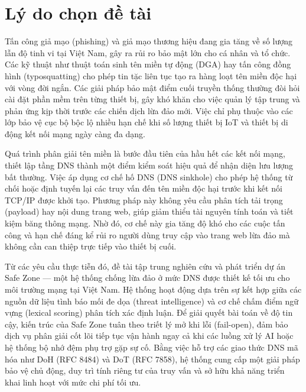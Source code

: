 \section{Lý do chọn đề tài}

Tấn công giả mạo (phishing) và giả mạo thương hiệu đang gia tăng về số lượng lẫn độ tinh vi tại Việt Nam, gây ra rủi ro bảo mật lớn cho cá nhân và tổ chức. Các kỹ thuật như thuật toán sinh tên miền tự động (DGA) hay tấn công đồng hình (typosquatting) cho phép tin tặc liên tục tạo ra hàng loạt tên miền độc hại với vòng đời ngắn. Các giải pháp bảo mật điểm cuối truyền thống thường đòi hỏi cài đặt phần mềm trên từng thiết bị, gây khó khăn cho việc quản lý tập trung và phản ứng kịp thời trước các chiến dịch lừa đảo mới. Việc chỉ phụ thuộc vào các lớp bảo vệ cục bộ bộc lộ nhiều hạn chế khi số lượng thiết bị IoT và thiết bị di động kết nối mạng ngày càng đa dạng.

Quá trình phân giải tên miền là bước đầu tiên của hầu hết các kết nối mạng, thiết lập tầng DNS thành một điểm kiểm soát hiệu quả để nhận diện lưu lượng bất thường. Việc áp dụng cơ chế hố DNS (DNS sinkhole) cho phép hệ thống từ chối hoặc định tuyến lại các truy vấn đến tên miền độc hại trước khi kết nối TCP/IP được khởi tạo. Phương pháp này không yêu cầu phân tích tải trọng (payload) hay nội dung trang web, giúp giảm thiểu tài nguyên tính toán và tiết kiệm băng thông mạng. Nhờ đó, cơ chế này gia tăng độ khó cho các cuộc tấn công và hạn chế đáng kể rủi ro người dùng truy cập vào trang web lừa đảo mà không cần can thiệp trực tiếp vào thiết bị cuối.

Từ các yêu cầu thực tiễn đó, đề tài tập trung nghiên cứu và phát triển dự án Safe Zone --- một hệ thống chống lừa đảo ở mức DNS được thiết kế tối ưu cho môi trường mạng tại Việt Nam. Hệ thống hoạt động dựa trên sự kết hợp giữa các nguồn dữ liệu tình báo mối đe dọa (threat intelligence) và cơ chế chấm điểm ngữ vựng (lexical scoring) phân tích xác định luận. Để giải quyết bài toán về độ tin cậy, kiến trúc của Safe Zone tuân theo triết lý mở khi lỗi (fail-open), đảm bảo dịch vụ phân giải cốt lõi tiếp tục vận hành ngay cả khi các luồng xử lý AI hoặc hệ thống bộ nhớ đệm phụ trợ gặp sự cố. Bằng việc hỗ trợ các giao thức DNS mã hóa như DoH (RFC 8484) và DoT (RFC 7858), hệ thống cung cấp một giải pháp bảo vệ chủ động, duy trì tính riêng tư của truy vấn và sở hữu khả năng triển khai linh hoạt với mức chi phí tối ưu.
